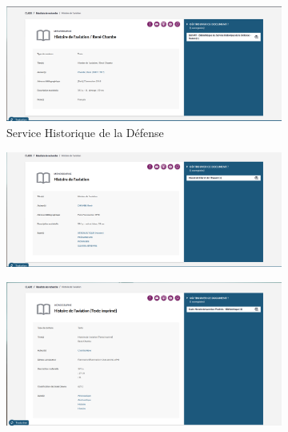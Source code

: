 \begin{figure}[htbp]
	\centering
	\begin{subfigure}{0.7\textwidth}
		\centering
		\includegraphics[width=\linewidth]{img/IMG_clade_histoireaviation_shdTL}
		\caption{Service Historique de la Défense}
		\label{img:cladehistoireaviationshdtl}
	\end{subfigure}
	\begin{subfigure}{0.7\textwidth}
		\centering
		\includegraphics[width=\linewidth]{img/IMG_clade_histoireaviation_mae}
		\caption{\mae}
		\label{img:cladehistoireaviationsmae}
	\end{subfigure}
	\hfill
	\begin{subfigure}{0.7\textwidth}
		\centering
		\includegraphics[width=\linewidth]{img/IMG_clade_histoireaviation_navale}

\end{subfigure}
\end{figure}
